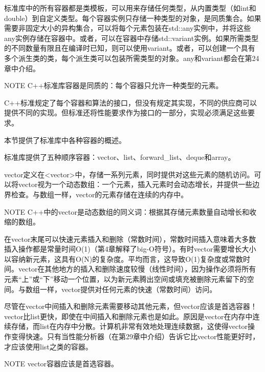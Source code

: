 标准库中的所有容器都是类模板，可以用来存储任何类型，从内置类型（如int和double）到自定义类型。每个容器实例只存储一种类型的对象，是同质集合。如果需要非固定大小的异构集合，可以将每个元素包装在std::any实例中，并将这些any实例存储在容器中。或者，可以在容器中存储std::variant实例。如果所需类型的不同数量有限且在编译时已知，则可以使用variant。或者，可以创建一个具有多个派生类的类，每个派生类可以包装所需类型的对象。any和variant都会在第24章中介绍。

\begin{myNotic}{NOTE}
C++标准库容器是同质的：每个容器只允许一种类型的元素。
\end{myNotic}

C++标准规定了每个容器和算法的接口，但没有规定其实现，不同的供应商可以提供不同的实现。但标准还将性能要求作为接口的一部分，实现必须满足这些要求。

本节提供了标准库中各种容器的概述。


标准库提供了五种顺序容器：vector、list、forward\_list、deque和array。


vector定义在<vector>中，存储一系列元素，同时提供对这些元素的随机访问。可以将vector视为一个动态数组：一个元素，插入元素时会动态增长，并提供一些边界检查。与数组一样，vector的元素存储在连续的内存中。

\begin{myNotic}{NOTE}
C++中的vector是动态数组的同义词：根据其存储元素数量自动增长和收缩的数组。
\end{myNotic}

在vector末尾可以快速元素插入和删除（常数时间），常数时间插入意味着大多数插入操作都是常量时间O(1)（第4章解释了big-O符号）。有时vector需要增长大小以容纳新元素，这具有O(N)的复杂度。平均而言，这导致O(1)复杂度或常数时间。vector在其他地方的插入和删除速度较慢（线性时间），因为操作必须将所有元素“上”或“下”移动一个位置，以为新元素腾出空间或填充被删除元素留下的空间。与数组一样，vector提供对任何元素的快速（常数时间）访问。

尽管在vector中间插入和删除元素需要移动其他元素，但vector应该是首选容器！vector比list更快，即使在中间插入和删除元素也是如此。原因是vector在内存中连续存储，而list在内存中分散。计算机非常有效地处理连续数据，这使得vector操作变得快速。只有当性能分析器（在第29章中介绍）告诉它比vector性能更好时，才应该使用list之类的容器。

\begin{myNotic}{NOTE}
vector容器应该是首选容器。
\end{myNotic}

